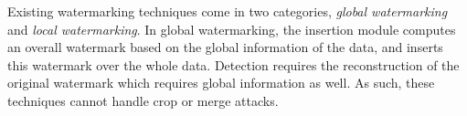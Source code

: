 

Existing watermarking techniques come in two categories, 
{\em global watermarking} and {\em local watermarking}. 
In global watermarking,
the insertion module computes an overall watermark based on 
the global information of the data, 
and inserts this watermark over the whole data. Detection requires
the reconstruction of the original watermark which requires
global information as well. As such, these techniques cannot handle
crop or merge attacks. 


